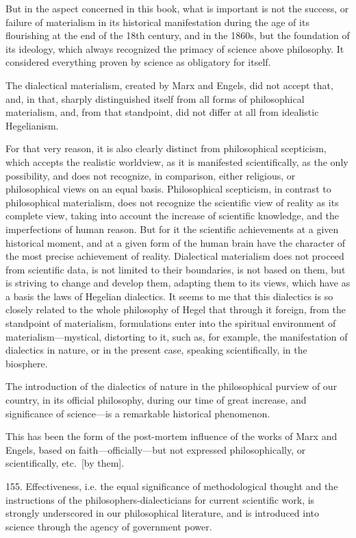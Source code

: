 But in the aspect concerned in this book, what is important is not the success,
or failure of materialism in its historical manifestation during the age of its
flourishing at the end of the 18th century, and in the 1860s, but the
foundation of its ideology, which always recognized the primacy of science
above philosophy.  It considered everything proven by science as obligatory for
itself.

The dialectical materialism, created by Marx and Engels, did not accept that,
and, in that, sharply distinguished itself from all forms of philosophical
materialism, and, from that standpoint, did not differ at all from idealistic
Hegelianism.

For that very reason, it is also clearly distinct from philosophical
scepticism, which accepts the realistic worldview, as it is manifested
scientifically, as the only possibility, and does not recognize, in comparison,
either religious, or philosophical views on an equal basis.  Philosophical
scepticism, in contrast to philosophical materialism, does not recognize the
scientific view of reality as its complete view, taking into account the
increase of scientific knowledge, and the imperfections of human reason.  But
for it the scientific achievements at a given historical moment, and at a given
form of the human brain have the character of the most precise achievement of
reality.  Dialectical materialism does not proceed from scientific data, is not
limited to their boundaries, is not based on them, but is striving to change
and develop them, adapting them to its views, which have as a basis the laws of
Hegelian dialectics.  It seems to me that this dialectics is so closely related
to the whole philosophy of Hegel that through it foreign, from the standpoint
of materialism, formulations enter into the spiritual environment of
materialism---mystical, distorting to it, such as, for example, the
manifestation of dialectics in nature, or in the present case, speaking
scientifically, in the biosphere.

The introduction of the dialectics of nature in the philosophical purview of
our country, in its official philosophy, during our time of great increase, and
significance of science---is a remarkable historical phenomenon.

This has been the form of the post-mortem influence of the works of Marx and
Engels, based on faith---officially---but not expressed philosophically, or
scientifically, etc.\ [by them].


155. Effectiveness, i.e. the equal significance of methodological thought and
the instructions of the philosophers-dialecticians for current scientific work,
is strongly underscored in our philosophical literature, and is introduced into
science through the agency of government power.

